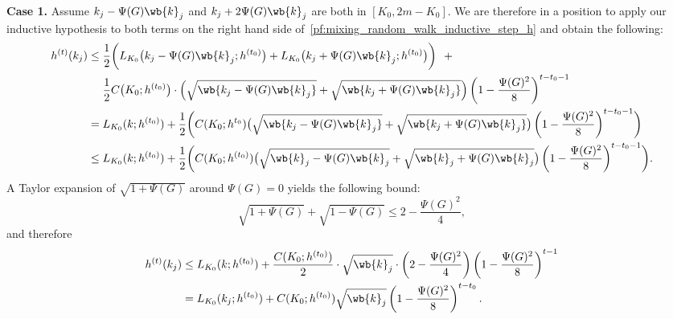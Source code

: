 	\textbf{Case 1.}
	Assume $k_j - \Psi(G) \wb{k}_j$ and $k_j + 2 \Psi(G) \wb{k}_j$ are both in $[K_0,2m  - K_0]$. We are therefore in a position to apply our inductive hypothesis to both terms on the right hand side of~\eqref{pf:mixing_random_walk_inductive_step_h} and obtain the following:
	\begin{align*}
	h^{(t)}(k_j) & \leq \frac{1}{2}\biggl(L_{K_0}\bigl(k_j - \Psi(G) \wb{k}_j; h^{(t_0)}\bigr) + L_{K_0}\bigl(k_j + \Psi(G) \wb{k}_j; h^{(t_0)}\bigr) \biggr) ~~+ \\
	& \quad~ \frac{1}{2}C\bigl(K_0; h^{(t_0)}\bigr) \cdot \Bigl(\sqrt{\wb{k_j - \Psi(G) \wb{k}_j}} + \sqrt{\wb{k_j + \Psi(G) \wb{k}_j}}\Bigr)\left(1 - \frac{\Psi(G)^2}{8}\right)^{t-t_0 - 1} \\
	& = L_{K_0}(k;h^{(t_0)}) + \frac{1}{2}\biggl(C(K_0;h^{t_0})\bigl(\sqrt{\wb{k_j - \Psi(G) \wb{k}_j}} + \sqrt{\wb{k_j + \Psi(G) \wb{k}_j}}\bigr)\left(1 - \frac{\Psi(G)^2}{8}\right)^{t-t_0 - 1} \biggr) \\
	& \leq L_{K_0}(k;h^{(t_0)}) + \frac{1}{2}\biggl(C(K_0;h^{(t_0)})\bigl(\sqrt{\wb{k}_j - \Psi(G) \wb{k}_j} + \sqrt{\wb{k}_j + \Psi(G) \wb{k}_j}\bigr)\left(1 - \frac{\Psi(G)^2}{8}\right)^{t-t_0 - 1} \biggr).
	\end{align*}
	A Taylor expansion of $\sqrt{1 + \Psi(G)}$ around $\Psi(G) = 0$ yields the following bound:
	\begin{equation*}
	\sqrt{1 + \Psi(G)} + \sqrt{1 - \Psi(G)} \leq 2 - \frac{\Psi(G)^2}{4},
	\end{equation*}
	and therefore
	\begin{align*}
	h^{(t)}(k_j) & \leq L_{K_0}(k;h^{(t_0)}) + \frac{C(K_0;h^{(t_0)})}{2}\cdot \sqrt{\wb{k}_j}\cdot\left(2 - \frac{\Psi(G)^2}{4}\right)\left(1 - \frac{\Psi(G)^2}{8}\right)^{t-1} \\
	&= L_{K_0}(k_j;h^{(t_0)}) + C(K_0;h^{(t_0)})\sqrt{\wb{k}_j}\left(1 - \frac{\Psi(G)^2}{8}\right)^{t - t_0}.
	\end{align*}
	
